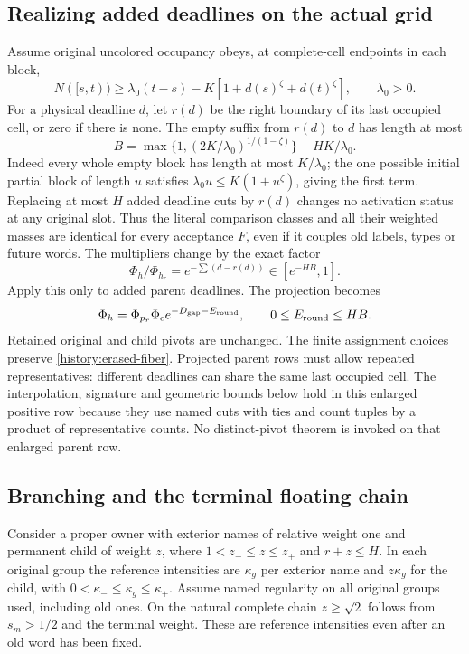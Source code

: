 \subsection{Realizing added deadlines on the actual grid}

Assume original uncolored occupancy obeys, at complete-cell endpoints
in each block,
\[
 N([s,t))\ge\lambda_0(t-s)-K[1+d(s)^\zeta+d(t)^\zeta],
 \qquad\lambda_0>0.
\]
For a physical deadline $d$, let $r(d)$ be the right boundary of its
last occupied cell, or zero if there is none. The empty suffix from
$r(d)$ to $d$ has length at most
\[
 B=\max\{1,(2K/\lambda_0)^{1/(1-\zeta)}\}+HK/\lambda_0.
\]
Indeed every whole empty block has length at most $K/\lambda_0$;
the one possible initial partial block of length $u$ satisfies
$\lambda_0u\le K(1+u^\zeta)$, giving the first term.
Replacing at most $H$ added deadline cuts by $r(d)$ changes no
activation status at any original slot. Thus the literal comparison
classes and all their weighted masses are identical for every
acceptance $F$, even if it couples old labels, types or future words.
The multipliers change by the exact factor
\[
 \Phi_h/\Phi_{h_r}=e^{-\sum(d-r(d))}\in[e^{-HB},1].
\]
Apply this only to added parent deadlines. The projection becomes
\[
 \Phi_h=\Phi_{p_r}\Phi_c e^{-D_{\rm gap}-E_{\rm round}},
 \qquad0\le E_{\rm round}\le HB.
\]
Retained original and child pivots are unchanged. The finite assignment
choices preserve \eqref{history:erased-fiber}. Projected parent rows
must allow repeated representatives: different deadlines can share
the same last occupied cell. The interpolation, signature and geometric
bounds below hold in this enlarged positive row because they use named
cuts with ties and count tuples by a product of representative counts.
No distinct-pivot theorem is invoked on that enlarged parent row.

\subsection{Branching and the terminal floating chain}

Consider a proper owner with exterior names of relative weight one and
permanent child of weight $z$, where $1<z_-\le z\le z_+$ and
$r+z\le H$. In each original group the reference intensities are
$\kappa_g$ per exterior name and $z\kappa_g$ for the child, with
$0<\kappa_-\le\kappa_g\le\kappa_+$. Assume named regularity on
all original groups used, including old ones. On the natural complete
chain $z\ge\sqrt2$ follows from $s_m>1/2$ and the terminal weight.
These are reference intensities even after an old word has been fixed.

